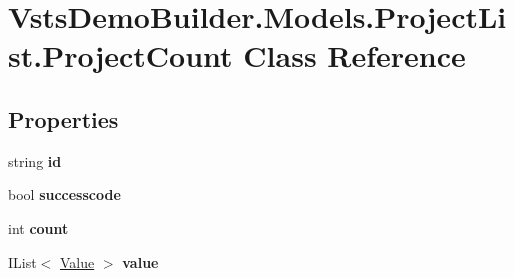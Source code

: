 \hypertarget{class_vsts_demo_builder_1_1_models_1_1_project_list_1_1_project_count}{}\section{Vsts\+Demo\+Builder.\+Models.\+Project\+List.\+Project\+Count Class Reference}
\label{class_vsts_demo_builder_1_1_models_1_1_project_list_1_1_project_count}
\subsection*{Properties}
\begin{DoxyCompactItemize}
\item 
\mbox{\label{class_vsts_demo_builder_1_1_models_1_1_project_list_1_1_project_count_af69ea396e01f98a6751799e78a5fd393}} 
string {\bfseries id}
\item 
\mbox{\label{class_vsts_demo_builder_1_1_models_1_1_project_list_1_1_project_count_ae397d09bba16ff3e99d735e3bb49bc94}} 
bool {\bfseries successcode}
\item 
\mbox{\label{class_vsts_demo_builder_1_1_models_1_1_project_list_1_1_project_count_aaeb01291b73626bd99c4e5653906cd8d}} 
int {\bfseries count}
\item 
\mbox{\label{class_vsts_demo_builder_1_1_models_1_1_project_list_1_1_project_count_a6a54cb39fcfe8ac4a2f2d0f0125c9b8b}} 
I\+List$<$ \mbox{\hyperlink{class_vsts_demo_builder_1_1_models_1_1_project_list_1_1_value}{Value}} $>$ {\bfseries value}
\item 
\mbox{\label{class_vsts_demo_builder_1_1_models_1_1_project_list_1_1_project_count_ad2c63a0af6c8cb6beceed423b783ac46}} 

\end{DoxyCompactItemize}

